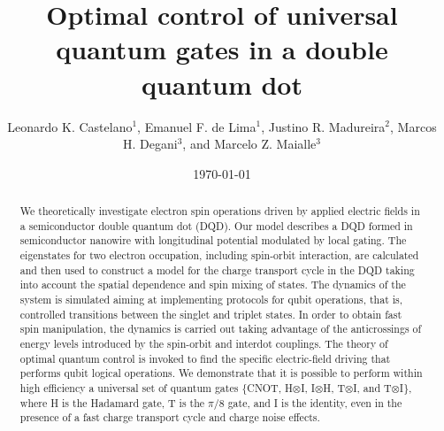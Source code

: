 \documentclass[prb,twocolumn,showpacs,floats]{revtex4}
\begin{document}
 

\title{Optimal control of universal quantum gates in a double quantum dot }


\author{ Leonardo K. Castelano$^1$, Emanuel F. de Lima$^1$, Justino R. Madureira$^2$, Marcos H. Degani$^3$, and Marcelo Z. Maialle$^3$}


 




\date{\today}


\begin{abstract} 

We theoretically investigate electron spin operations driven by applied electric fields 
in a semiconductor double quantum dot (DQD). 
Our model describes a DQD formed in semiconductor nanowire with longitudinal potential modulated by local gating. 
The eigenstates for two electron occupation, including spin-orbit interaction, are calculated and then used to construct 
a model for the charge transport cycle in the DQD taking into account the spatial dependence and spin mixing of states. 
 The dynamics of the system is simulated aiming at implementing protocols 
for qubit operations,  that is, controlled transitions between the singlet and triplet states. 
In order to obtain fast spin manipulation, the dynamics is  
carried out taking advantage of the anticrossings of energy levels introduced 
by the spin-orbit and interdot couplings. The theory of optimal quantum control is  invoked to find the 
specific electric-field driving that performs qubit logical operations. We demonstrate that it is possible to 
perform within high efficiency a universal set of quantum gates 
$\{$CNOT, H$\otimes$I, I$\otimes$H, T$\otimes$I, and T$\otimes$I$\}$, 
where H is the Hadamard gate, T is the $\pi/8$ gate, and I is the identity, even in the 
presence of a fast charge transport cycle and charge noise effects.

\end{abstract} 


 \maketitle
\end{document}
